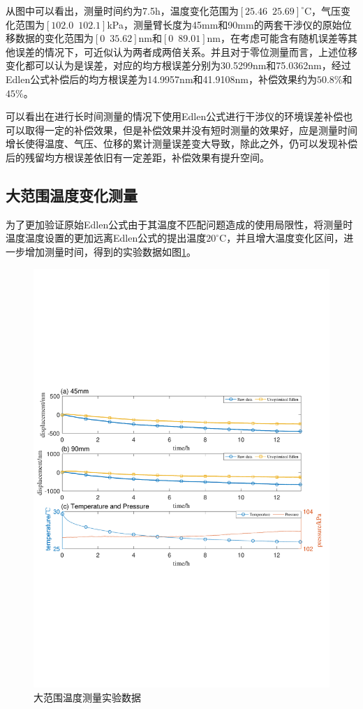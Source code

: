 从图中可以看出，测量时间约为7.5h，温度变化范围为$[25.46\,\,\,25.69]^{\circ} \mathrm{C}$，气压变化范围为$[102.0\,\,\,102.1]$kPa，测量臂长度为45mm和90mm的两套干涉仪的原始位移数据的变化范围为$[0\,\,\,35.62]$nm和$[0\,\,\,89.01]$nm，在考虑可能含有随机误差等其他误差的情况下，可近似认为两者成两倍关系。并且对于零位测量而言，上述位移变化都可以认为是误差，对应的均方根误差分别为30.5299nm和75.0362nm，经过Edlen公式补偿后的均方根误差为14.9957nm和41.9108nm，补偿效果约为$50.8\%$和$45\%$。

可以看出在进行长时间测量的情况下使用Edlen公式进行干涉仪的环境误差补偿也可以取得一定的补偿效果，但是补偿效果并没有短时测量的效果好，应是测量时间增长使得温度、气压、位移的累计测量误差变大导致，除此之外，仍可以发现补偿后的残留均方根误差依旧有一定差距，补偿效果有提升空间。

\subsection{大范围温度变化测量}
为了更加验证原始Edlen公式由于其温度不匹配问题造成的使用局限性，将测量时温度温度设置的更加远离Edlen公式的提出温度$20^{\circ} \mathrm{C}$，并且增大温度变化区间，进一步增加测量时间，得到的实验数据如图\ref{fig:大范围温度测量实验数据}。
\begin{figure}[htb]
    \centering
    \includegraphics[width=14cm]{fig/3-fig/大范围温度测量实验数据.pdf}
    \caption{大范围温度测量实验数据}
    \label{fig:大范围温度测量实验数据}
  \end{figure}
